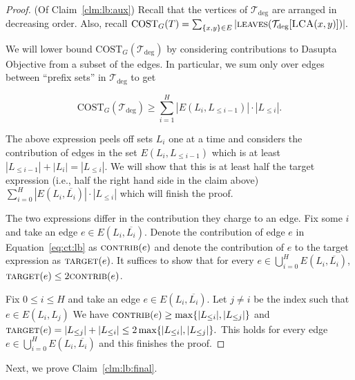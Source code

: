 \documentclass[letterpaper,11pt]{article}
\newcommand{\tdeg}{\mathcal{T}_{\deg}}
\newcommand{\target}{\textsc{target}}
\newcommand{\lca}{\textsc{LCA}}
\newcommand{\CT}{\text{COST}}
\newcommand{\lv}{\textsc{leaves}}
\newcommand{\contrib}{\textsc{contrib}}
\theoremstyle{plain}
\theoremstyle{definition}
\theoremstyle{remark}
\begin{document}
\begin{proof} (Of Claim~\ref{clm:lb:aux})
	Recall that the vertices of $\tdeg$ are arranged in decreasing order. 
	Also, recall $\CT_G(T) = \sum_{\{x,y\}\in E} |\lv(\tdeg[\lca(x, y)])|\text{.}$
	
	We will lower bound $\CT_G(\tdeg)$ by considering contributions to
	Dasupta Objective from a subset of the edges. In particular, we sum 
	only over edges between ``prefix sets'' in $\tdeg$ to get
	
	\begin{equation} \label{eq:ct:lb}
		\CT_G(\tdeg) \geq \sum_{i=1}^{H} |E(L_i, L_{\leq i-1})| \cdot |L_{\leq i}|. 
	\end{equation}
	
	The above expression peels off sets $L_i$ one at a time and considers
	the contribution of edges in the set $E(L_i, L_{\leq i-1})$ which is at least 
	$|L_{\leq i-1}| + |L_i| = |L_{\leq i}|$. We will show that this is at least 
	half the target expression (i.e., half the right hand side in the claim above) 
	$ \sum_{i=0}^{H} |E(L_i, \overline{L_i})| \cdot |L_{\leq i}|$ which will finish the proof. 
	
	The two expressions differ in the contribution they charge to an edge.
	Fix some $i$ and take an edge $e \in E(L_i, \overline{L_i})$.
	Denote the contribution of edge $e$ in Equation~\eqref{eq:ct:lb}
	as $\contrib(e)$ and denote the contribution of $e$ to the target expression 
	as $\target(e)$. It suffices to show that for every 
	$e \in \bigcup_{i=0}^{H} E(L_i, \overline{L_i})$, $\target(e) \leq 2 \contrib(e)$. 
	
	
	Fix $0 \leq i \leq H$ and take an edge $e \in E(L_i, \overline{L_i})$.  Let $j \neq i $ be the index such that $e \in E(L_i, L_j)$ We have $\contrib(e) \geq \max\{ |L_{\leq i}|, |L_{\leq j}|\}$ and 
	$\target(e) =  |L_{\leq j}| + |L_{\leq i}| \leq 2  \max\{ |L_{\leq i}|, |L_{\leq j}|\}.$ This holds for every edge
	$e \in \bigcup_{i=0}^{H} E(L_i, \overline{L_i})$ and this finishes the proof.
\end{proof}

Next, we prove Claim~\ref{clm:lb:final}.
\end{document}
